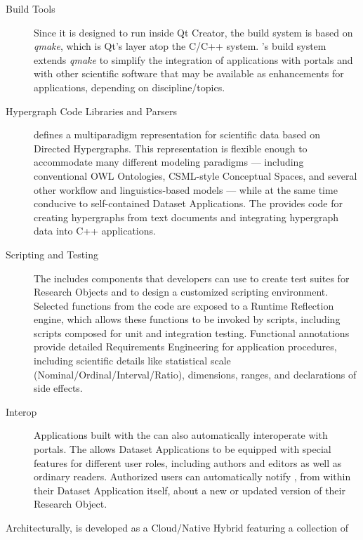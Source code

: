 \documentclass[10pt,letterpaper]{article}
\begin{document}
\begin{description}
\item[Build Tools]  Since it is designed to run 
inside Qt Creator, the {\RAK} build system 
is based on \textit{qmake}, which is Qt's 
layer atop the C/C++  system.  
{\lfMOSAIC}'s build system extends \textit{qmake} to 
simplify the integration of {\RAK} applications 
with {\MOSAIC} portals and with other scientific 
software that may be available as enhancements 
for {\RAK} applications, depending on  
discipline/topics.

\item[Hypergraph Code Libraries and Parsers]  
{\lfMOSAIC} defines a multiparadigm representation for 
scientific data based on Directed Hypergraphs.  
This representation is flexible enough to 
accommodate many different modeling 
paradigms --- including 
conventional OWL Ontologies, 
CSML-style Conceptual Spaces, and 
several other workflow and linguistics-based models 
--- while at the same time conducive to self-contained 
Dataset Applications.  The {\MOSAIC} {\SDK} provides 
code for creating hypergraphs from text documents and 
integrating hypergraph data into C++ applications.

\item[Scripting and Testing]  The {\MOSAIC} {\SDK} includes 
components that developers can use to create 
test suites for Research Objects and to design a 
customized scripting environment.  Selected 
functions from the {\RO} code are exposed 
to a Runtime Reflection engine, which allows these 
functions to be invoked by scripts, including 
scripts composed for unit and integration testing.  
Functional annotations provide detailed Requirements 
Engineering for application procedures, including scientific 
details like statistical scale (Nominal/Ordinal/Interval/Ratio),
dimensions, ranges, and declarations of side effects.

\item[{\lMOSAIC} Interop]  Applications built 
with the {\MOSAIC} {\SDK} can also automatically 
interoperate with {\MOSAIC} portals.  The {\SDK} 
allows Dataset Applications to be equipped 
with special features for different user roles, 
including authors and editors as well as ordinary readers.  
Authorized 
users can automatically notify {\MOSAIC}, 
from within their Dataset Application itself, about 
a new or updated version of their Research Object.
\end{description}
\p{}
Architecturally, {\MOSAIC} is developed as a 
Cloud/Native Hybrid featuring a collection of 
\end{document}
